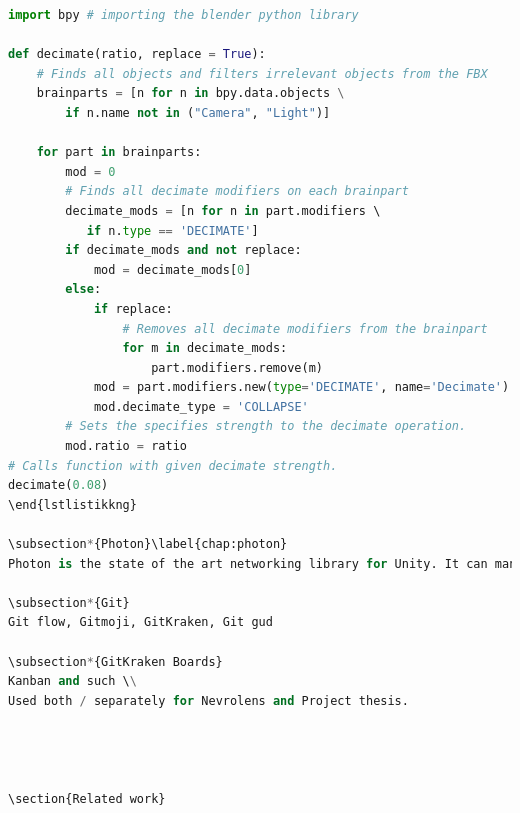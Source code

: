 \begin{lstlisting}[language=python, label={item:blenderscript}, caption={Blender script applying a decimate modifier to all relevant objects in a scene.}]
import bpy # importing the blender python library

def decimate(ratio, replace = True):
    # Finds all objects and filters irrelevant objects from the FBX 
    brainparts = [n for n in bpy.data.objects \
        if n.name not in ("Camera", "Light")]

    for part in brainparts:
        mod = 0
        # Finds all decimate modifiers on each brainpart
        decimate_mods = [n for n in part.modifiers \ 
           if n.type == 'DECIMATE']
        if decimate_mods and not replace:
            mod = decimate_mods[0]
        else:
            if replace: 
                # Removes all decimate modifiers from the brainpart
                for m in decimate_mods:
                    part.modifiers.remove(m)
            mod = part.modifiers.new(type='DECIMATE', name='Decimate')
            mod.decimate_type = 'COLLAPSE'
        # Sets the specifies strength to the decimate operation. 
        mod.ratio = ratio
# Calls function with given decimate strength.
decimate(0.08)
\end{lstlistikkng}

\subsection*{Photon}\label{chap:photon}
Photon is the state of the art networking library for Unity. It can manage everything from voice chat to interaction over network. This has not jet been used in the project, but will be referred to in \nameref{chap:futurework}. 

\subsection*{Git}
Git flow, Gitmoji, GitKraken, Git gud 

\subsection*{GitKraken Boards}
Kanban and such \\
Used both / separately for Nevrolens and Project thesis.




\section{Related work}


\end{lstlisting}
